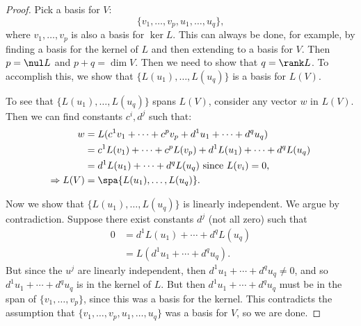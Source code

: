 \begin{proof}
Pick a basis for $V$:
\[
\{ v_1,\ldots,v_p,u_1,\ldots, u_q \},
\]
where $v_1,\ldots,v_p$ is also a basis for $\ker L$.  This can always be done, for example, by finding a basis for the kernel of $L$ and then extending to a basis for $V$.  Then $p=\nul L$ and $p+q=\dim V$.  Then we need to show that $q=\rank L$.  To accomplish this, we show that 
$\{L(u_1),\ldots,L(u_q)\}$ is a basis for $L(V)$.

To see that $\{L(u_1),\ldots,L(u_q)\}$ spans $L(V)$, consider any vector $w$ in $L(V)$.  Then we can find constants $c^i, d^j$ such that:
\begin{align*}
w &= L(c^1v_1 + \cdots + c^pv_p+d^1u_1 + \cdots + d^qu_q)\\
  &= c^1L(v_1) + \cdots + c^pL(v_p)+d^1L(u_1)+\cdots+d^qL(u_q)\\
  &= d^1L(u_1)+\cdots+d^qL(u_q) \text{ since $L(v_i)=0$,}\\
\Rightarrow L(V) &= \spa \{L(u_1), \ldots, L(u_q)  \}.
\end{align*}

Now we show that $\{L(u_1),\ldots,L(u_q)\}$ is linearly independent.  We argue by contradiction. Suppose there exist constants $d^j$ (not all zero) such that
\begin{align*}
0 &= d^1L(u_1)+\cdots+d^qL(u_q)\\
  &= L(d^1u_1+\cdots+d^qu_q).
\end{align*}
But since the $u^j$ are linearly independent, then $d^1u_1+\cdots+d^qu_q\neq 0$, and so $d^1u_1+\cdots+d^qu_q$ is in the kernel of $L$.  But then $d^1u_1+\cdots+d^qu_q$ must be in the span of $\{v_1,\ldots, v_p\}$, since this was a basis for the kernel.  This contradicts the assumption that $\{ v_1,\ldots,v_p,u_1,\ldots, u_q \}$ was a basis for $V$, so we are done.
\end{proof}


